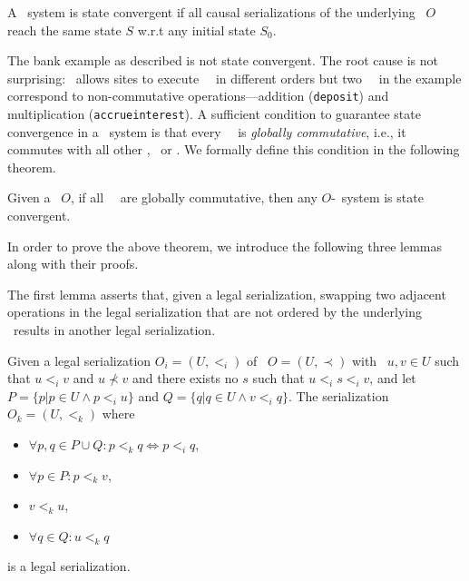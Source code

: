 \begin{mydef}
A \RBct\ system is state convergent if all causal serializations of
the underlying \RBo\ $O$ reach the same state $S$ w.r.t any initial state $S_0$.
\end{mydef}

The bank example as described is not state convergent. The root cause is not surprising: \RBc\ allows
sites to execute \blue\ \operations\ in different orders but two
\blue\ \operations\ in the example correspond to non-commutative
operations---addition ({\tt dep\-osit}) and multiplication ({\tt accrueinterest}).
A sufficient condition to guarantee state convergence in a
\RBct\ system is that every \blue\ \operation\ is {\em globally commutative}, i.e., it commutes with all other
\operations, \blue\ or \red. We formally define this condition in the following
theorem.

\begin{theorem}
Given a \RBo\ $O$, if all \blue\ \operations\ are globally commutative, then 
any $O$-\RBct\ system is state convergent.
\label{them:commute}
\end{theorem}

In order to prove the above theorem, we introduce the following three lemmas along with 
their proofs.

The first lemma asserts that, given a legal serialization, swapping two
adjacent operations in the legal serialization that are not ordered by
the underlying \RBo\ results in another legal serialization.
\begin{lemma}\label{lem:canSwap}
Given a legal serialization $O_i=(U,<_i)$ of \RBo\ $O=(U,\prec)$
with \transactions\ $u,v\in U$ such that $u<_iv$ and $u \not\prec v$ and
there exists no $s$ such that $u<_{i}s<_{i}v$, and let $P=\{ p | p \in U \wedge p <_i u\}$
and $Q=\{q | q \in U \wedge v <_i q\}$. The serialization $O_k=(U,<_k)$ where
  \begin{itemize}
    \item $\forall p,q\in P \cup Q: p<_kq
      \Longleftrightarrow p<_iq$,
  \item $\forall p \in P: p <_k v$,
  \item $v<_k u$,
  \item $\forall q \in Q: u <_k q$
 \end{itemize}
 is a legal serialization.
 \end{lemma}

